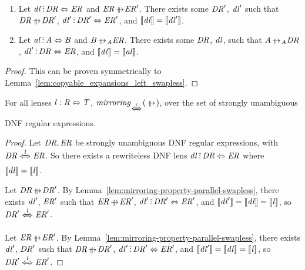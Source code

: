 \documentclass[numbers,10pt,preprint\ifanon ,nocopyrightspace\fi]{sigplanconf}
\begin{document}
\begin{lemma}
  \label{lem:copyable_expansions_right_swapless}\leavevmode
  \begin{enumerate}
  \item Let $\mathit{dl} \,\tilde{:}\, \mathit{DR} \Leftrightarrow
    \mathit{ER}$ and $\DNFRegexAlt \ParallelRewrite \DNFRegexAlt'$.  There exists some
    $\mathit{DR}'$, $\mathit{dl}'$ such that $\DNFRegex \ParallelRewrite
    \DNFRegex'$,
    $\mathit{dl}' \,\tilde{:}\,
    \mathit{DR}' \Leftrightarrow \mathit{ER}'$, and $[ \! [\mathit{dl}] \! ] =
    [ \! [\mathit{dl}'] \! ]$.
  \item Let $\mathit{al} \,\tilde{:}\, \mathit{A} \Leftrightarrow \mathit{B}$ and
    $\AtomAlt \ParallelRewriteAtom \DNFRegexAlt$.  There exists some $\mathit{DR}$,
    $\mathit{dl}$, such that $\Atom \ParallelRewriteAtom \DNFRegex$,
    $\mathit{dl}' \,\tilde{:}\, \mathit{DR}
    \Leftrightarrow \mathit{ER}$, and $[ \! [\mathit{dl}] \! ] =
    [ \! [\mathit{al}] \! ]$.
  \end{enumerate}
\end{lemma}
\begin{proof}
  This can be proven symmetrically to Lemma~\ref{lem:copyable_expansions_left_swapless}.
\end{proof}

\begin{lemma}
  \label{lem:mirroring-property-parallel-swapless}
  For all lenses $\mathit{l} : \mathit{R} \Leftrightarrow \mathit{T}$,
  $\IsMirroringWithPropertyOf{\ParallelRewrite}{\DNFLensHasSemanticsOf{\Lens}}$,
  over the set of strongly unambiguous DNF regular expressions.
\end{lemma}
\begin{proof}
  Let $\mathit{DR},\mathit{ER}$ be strongly unambiguous DNF regular expressions,
  with $\DNFRegex \DNFLensHasSemanticsOf{\Lens} \DNFRegexAlt$.
  So there exists a rewriteless DNF lens
  $\mathit{dl} \,\tilde{:}\, \mathit{DR} \Leftrightarrow \mathit{ER}$ where
  $[ \! [\mathit{dl}] \! ] = [ \! [\mathit{l}] \! ]$.

  Let $\DNFRegex \ParallelRewrite \DNFRegex'$.  By
  Lemma~\ref{lem:mirroring-property-parallel-swapless}, there exists $\mathit{dl}'$,
  $\mathit{ER}'$ such that $\DNFRegexAlt \ParallelRewrite \DNFRegexAlt'$,
  $\mathit{dl}' \,\tilde{:}\, \mathit{DR}' \Leftrightarrow \mathit{ER}'$,
  and $[ \! [\mathit{dl}'] \! ] = [ \! [\mathit{dl}] \! ] = [ \! [\mathit{l}] \! ]$,
  so $\DNFRegex' \DNFLensHasSemanticsOf{\Lens} \DNFRegexAlt'$.

  Let $\DNFRegexAlt \ParallelRewrite \DNFRegexAlt'$.  By
  Lemma~\ref{lem:mirroring-property-parallel-swapless}, there exists $\mathit{dl}'$,
  $\mathit{DR}'$ such that $\DNFRegex \ParallelRewrite \DNFRegex'$,
  $\mathit{dl}' \,\tilde{:}\, \mathit{DR}' \Leftrightarrow \mathit{ER}'$,
  and $[ \! [\mathit{dl}'] \! ] = [ \! [\mathit{dl}] \! ] = [ \! [\mathit{l}] \! ]$,
  so $\DNFRegex' \DNFLensHasSemanticsOf{\Lens} \DNFRegexAlt'$.
\end{proof}
\end{document}
